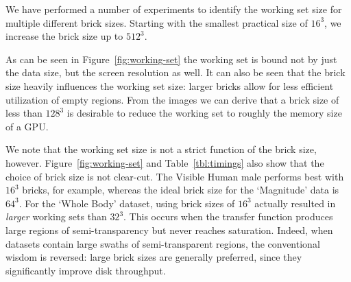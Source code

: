 We have performed a number of experiments to identify the working set
size for multiple different brick sizes.  Starting with the smallest
practical size of $16^3$, we increase the brick size up to $512^3$.

As can be seen in Figure~\ref{fig:working-set} the working set is bound
not by just the data size, but the screen resolution as well.  It can
also be seen that the brick size heavily influences the working set
size: larger bricks allow for less efficient utilization of empty
regions. From the images we can derive that a brick size of less than
$128^3$ is desirable to reduce the working set to roughly the memory
size of a GPU.

We note that the working set size is not a strict function of the brick
size, however.  Figure~\ref{fig:working-set} and
Table~\ref{tbl:timings} also show that the choice of brick size is not
clear-cut.  The Visible Human male performs best with $16^3$ bricks,
for example, whereas the ideal brick size for the `Magnitude' data is
$64^3$.  For the `Whole Body' dataset, using brick sizes of
$16^3$ actually resulted in \emph{larger} working sets than $32^3$.
This occurs when the transfer function produces large regions
of semi-transparency but never reaches saturation.  Indeed, when datasets
contain large swaths of semi-transparent regions, the conventional
wisdom is reversed: large brick sizes are generally preferred, since
they significantly improve disk throughput.

%
%


